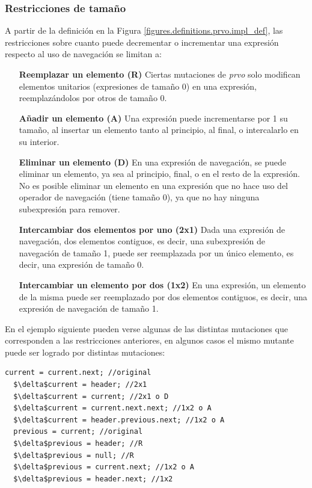 \subsubsection{Restricciones de tama\~no}
\label{sec:implementation.prvo.restrictions.size}

A partir de la definici\'on en la Figura \ref{figures.definitions.prvo.impl_def}, las restricciones sobre cuanto puede decrementar o incrementar una expresi\'on respecto al uso de navegaci\'on se limitan a:

\begin{enumerate}[leftmargin=.75cm,align=left]
	\item[\textbf{Reemplazar un elemento (R)}] Ciertas mutaciones de \emph{prvo} solo modifican elementos unitarios (expresiones de tama\~no 0) en una expresi\'on, reemplaz\'andolos por otros de tama\~no 0.
	
	\item[\textbf{A\~nadir un elemento (A)}] Una expresi\'on puede incrementarse por 1 su tama\~no, al insertar un elemento tanto al principio, al final, o intercalarlo en su interior.
	
	\item[\textbf{Eliminar un elemento (D)}] En una expresi\'on de navegaci\'on, se puede eliminar un elemento, ya sea al principio, final, o en el resto de la expresi\'on. No es posible eliminar un elemento en una expresi\'on que no hace uso del operador de navegaci\'on (tiene tama\~no 0), ya que no hay ninguna subexpresi\'on para remover.
	
	\item[\textbf{Intercambiar dos elementos por uno (2x1)}] Dada una expresi\'on de navegaci\'on, dos elementos contiguos, es decir, una subexpresi\'on de navegaci\'on de tama\~no 1, puede ser reemplazada por un \'unico elemento, es decir, una expresi\'on de tama\~no 0.
	
	\item[\textbf{Intercambiar un elemento por dos (1x2)}] En una expresi\'on, un elemento de la misma puede ser reemplazado por dos elementos contiguos, es decir, una expresi\'on de navegaci\'on de tama\~no 1.
\end{enumerate}

En el ejemplo siguiente pueden verse algunas de las distintas mutaciones que corresponden a las restricciones anteriores, en algunos casos el mismo mutante puede ser logrado por distintas mutaciones:
\begin{lstlisting}[mathescape=true]
  current = current.next; //original
  $\delta$current = header; //2x1
  $\delta$current = current; //2x1 o D 
  $\delta$current = current.next.next; //1x2 o A
  $\delta$current = header.previous.next; //1x2 o A
  previous = current; //original
  $\delta$previous = header; //R
  $\delta$previous = null; //R
  $\delta$previous = current.next; //1x2 o A
  $\delta$previous = header.next; //1x2
\end{lstlisting}


